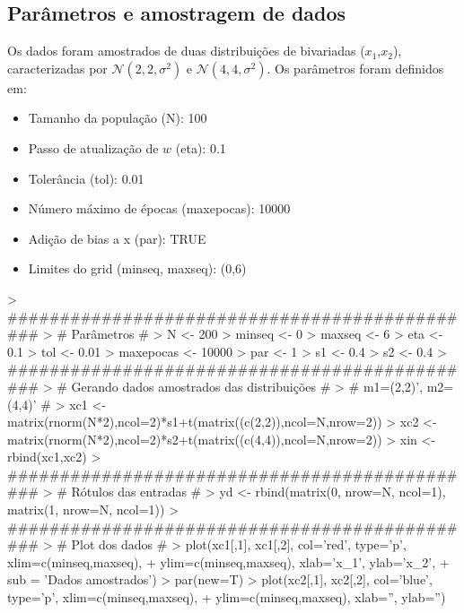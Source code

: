 \documentclass{article}
\begin{document}
\subsection{Parâmetros e amostragem de dados}
Os dados foram amostrados de duas distribuições de bivariadas ($x_{1}$,$x_{2}$), caracterizadas por $\mathcal{N}(2,2,\sigma^2)$ e $\mathcal{N}(4,4,\sigma^2)$. Os parâmetros foram definidos em:
\begin{itemize}
\item Tamanho da população (N): 100
\item Passo de atualização de $w$ (eta): 0.1
\item Tolerância (tol): 0.01
\item Número máximo de épocas (maxepocas): 10000
\item Adição de bias a x (par): TRUE
\item Limites do grid (minseq, maxseq): (0,6)
\end{itemize}
\begin{Schunk}
\begin{Sinput}
> ##############################################
> # Parâmetros #
> N <- 200
> minseq <- 0
> maxseq <- 6
> eta <- 0.1
> tol <- 0.01
> maxepocas <- 10000
> par <- 1
> s1 <- 0.4
> s2 <- 0.4
> ##############################################
> # Gerando dados amostrados das distribuições #
> # m1=(2,2)', m2=(4,4)' #
> xc1 <- matrix(rnorm(N*2),ncol=2)*s1+t(matrix((c(2,2)),ncol=N,nrow=2))
> xc2 <- matrix(rnorm(N*2),ncol=2)*s2+t(matrix((c(4,4)),ncol=N,nrow=2))
> xin <- rbind(xc1,xc2)
> ##############################################
> # Rótulos das entradas #
> yd <- rbind(matrix(0, nrow=N, ncol=1), matrix(1, nrow=N, ncol=1))
> ##############################################
> # Plot dos dados #
> plot(xc1[,1], xc1[,2], col='red', type='p', xlim=c(minseq,maxseq), 
+      ylim=c(minseq,maxseq), xlab='x_1', ylab='x_2',
+      sub = 'Dados amostrados')
> par(new=T)
> plot(xc2[,1], xc2[,2], col='blue', type='p', xlim=c(minseq,maxseq), 
+      ylim=c(minseq,maxseq), xlab='', ylab='')
\end{Sinput}
\end{Schunk}
\end{document}
